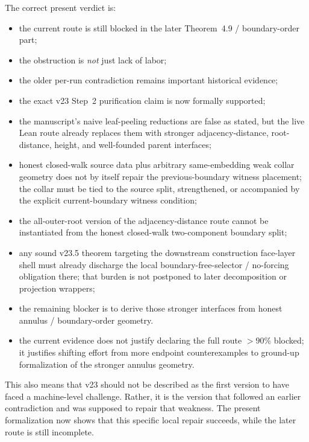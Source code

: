 \documentclass[11pt]{article}
\begin{document}
The correct present verdict is:
\begin{itemize}[leftmargin=2em]
\item the current route is still blocked in the later Theorem~4.9 /
boundary-order part;
\item the obstruction is \emph{not} just lack of labor;
\item the older per-run contradiction remains important historical evidence;
\item the exact v23 Step~2 purification claim is now formally supported;
\item the manuscript's naive leaf-peeling reductions are false as stated, but
the live Lean route already replaces them with stronger adjacency-distance,
root-distance, height, and well-founded parent interfaces;
\item honest closed-walk source data plus arbitrary same-embedding weak collar
geometry does not by itself repair the previous-boundary witness placement; the
collar must be tied to the source split, strengthened, or accompanied by the
explicit current-boundary witness condition;
\item the all-outer-root version of the adjacency-distance route cannot be
instantiated from the honest closed-walk two-component boundary split;
\item any sound v23.5 theorem targeting the downstream construction face-layer
shell must already discharge the local boundary-free-selector / no-forcing
obligation there; that burden is not postponed to later decomposition or
projection wrappers;
\item the remaining blocker is to derive those stronger interfaces from honest
annulus / boundary-order geometry.
\item the current evidence does not justify declaring the full route \(>90\%\)
blocked; it justifies shifting effort from more endpoint counterexamples to
ground-up formalization of the stronger annulus geometry.
\end{itemize}

This also means that v23 should not be described as the first version to have
faced a machine-level challenge.  Rather, it is the version that followed an
earlier contradiction and was supposed to repair that weakness.  The present
formalization now shows that this specific local repair succeeds, while the
later route is still incomplete.
\end{document}
